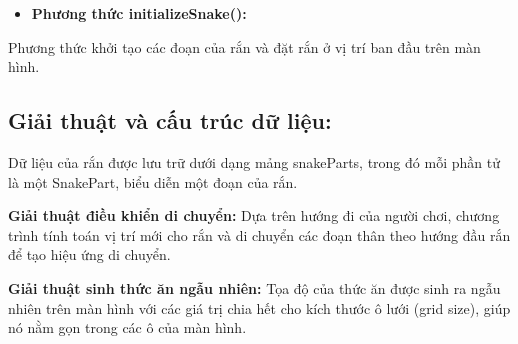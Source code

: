 \documentclass[a4paper, 12pt]{article}
\begin{document}
\begin{itemize}
    \item \textbf{Phương thức initializeSnake():}
\end{itemize}

Phương thức khởi tạo các đoạn của rắn và đặt rắn ở vị trí ban đầu trên màn hình.

\subsection{Giải thuật và cấu trúc dữ liệu:}

Dữ liệu của rắn được lưu trữ dưới dạng mảng snakeParts, trong đó mỗi phần tử là một SnakePart, biểu diễn một đoạn của rắn. 

\textbf{Giải thuật điều khiển di chuyển:} Dựa trên hướng đi của người chơi, chương trình tính toán vị trí mới cho rắn và di chuyển các đoạn thân theo hướng đầu rắn để tạo hiệu ứng di chuyển.

\textbf{Giải thuật sinh thức ăn ngẫu nhiên:} Tọa độ của thức ăn được sinh ra ngẫu nhiên trên màn hình với các giá trị chia hết cho kích thước ô lưới (grid size), giúp nó nằm gọn trong các ô của màn hình.
\end{document}
